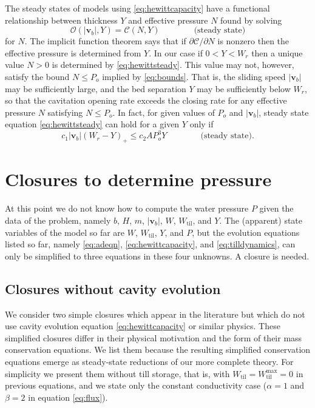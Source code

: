 \documentclass[gmd]{copernicus}   %
\newcommand{\text}{\textrm}
\newcommand\bv{\mathbf{v}}
\newcommand{\Wtil}{W_{\text{til}}}
\newcommand{\Wtilmax}{W_{\text{til}}^{\text{max}}}
\begin{document}
The steady states of models using \eqref{eq:hewittcapacity} have a functional relationship between thickness $Y$ and effective pressure $N$ found by solving
\begin{equation}
\mathcal{O}(|\bv_b|,Y) = \mathcal{C}(N,Y) \qquad \qquad \text{(steady state)} \label{eq:hewittsteady}
\end{equation}
for $N$.  The implicit function theorem says that if $\partial\mathcal{C}/\partial N$ is nonzero then the effective pressure is determined from $Y$.  In our case if $0<Y<W_r$ then a unique value $N>0$ is determined by \eqref{eq:hewittsteady}.  This value may not, however, satisfy the bound $N \le P_o$ implied by \eqref{eq:bounds}.  That is, the sliding speed $|\bv_b|$ may be sufficiently large, and the bed separation $Y$ may be sufficiently below $W_r$, so that the cavitation opening rate exceeds the closing rate for any effective pressure $N$ satisfying $N\le P_o$.  In fact, for given values of $P_o$ and $|\bv_b|$, steady state equation \eqref{eq:hewittsteady} can hold for a given $Y$ only if
\begin{equation}
c_1 |\bv_b| (W_r - Y)_+ \le c_2 A P_o^3 Y \qquad \qquad \text{(steady state)}. \label{eq:steadyOCbound}
\end{equation}


\section{Closures to determine pressure} \label{sec:closures}

At this point we do not know how to compute the water pressure $P$ given the data of the problem, namely $b$, $H$, $m$, $|\bv_b|$, $W$, $\Wtil$, and $Y$.  The (apparent) state variables of the model so far are $W$, $\Wtil$, $Y$, and $P$, but the evolution equations listed so far, namely \eqref{eq:adeqn}, \eqref{eq:hewittcapacity}, and \eqref{eq:tilldynamics}, can only be simplified to three equations in these four unknowns.   A closure is needed.

\subsection{Closures without cavity evolution}  We consider two simple closures which appear in the literature but which do not use cavity evolution equation \eqref{eq:hewittcapacity} or similar physics.  These simplified closures differ in their physical motivation and the form of their mass conservation equations.  We list them because the resulting simplified conservation equations emerge as steady-state reductions of our more complete theory.  For simplicity we present them without till storage, that is, with $\Wtil=\Wtilmax=0$ in previous equations, and we state only the constant conductivity case ($\alpha=1$ and $\beta=2$ in equation \eqref{eq:flux}).
\end{document}
